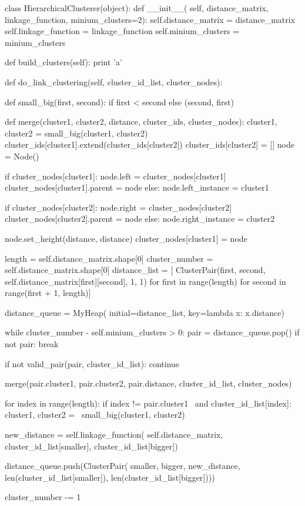 \documentclass[10pt]{article}
\begin{document}
\begin{python}
	
	class HierarchicalClusterer(object):
	def __init__(
	self,
	distance_matrix,
	linkage_function,
	minium_clusters=2):
	self.distance_matrix = distance_matrix
	self.linkage_function = linkage_function
	self.minium_clusters = minium_clusters
	
	def build_clusters(self):
	print 'a'
	
	def do_link_clustering(self, cluster_id_list, cluster_nodes):
	
	def small_big(first, second):
	if first < second else (second, first)
	
	def merge(cluster1,
	cluster2,
	distance,
	cluster_ids,
	cluster_nodes):
	cluster1, cluster2 = small_big(cluster1, cluster2)
	cluster_ids[cluster1].extend(cluster_ids[cluster2])
	cluster_ids[cluster2] = []
	node = Node()
	
	if cluster_nodes[cluster1]:
	node.left = cluster_nodes[cluster1]
	cluster_nodes[cluster1].parent = node
	else:
	node.left_instance = cluster1
	
	if cluster_nodes[cluster2]:
	node.right = cluster_nodes[cluster2]
	cluster_nodes[cluster2].parent = node
	else:
	node.right_instance = cluster2
	
	node.set_height(distance, distance)
	cluster_nodes[cluster1] = node
	
	length = self.distance_matrix.shape[0]
	cluster_number = self.distance_matrix.shape[0]
	distance_list = [
	ClusterPair(first,
	second,
	self.distance_matrix[first][second], 1, 1)
	for first in range(length) for second in range(first + 1, length)]
	
	distance_queue = MyHeap(
	initial=distance_list,
	key=lambda x: x.distance)
	
	while cluster_number - self.minium_clusters > 0:
	pair = distance_queue.pop()
	if not pair:
	break
	
	if not valid_pair(pair, cluster_id_list):
	continue
	
	merge(pair.cluster1, pair.cluster2,
	pair.distance, cluster_id_list, cluster_nodes)
	
	for index in range(length):
	if index != pair.cluster1 \
	and cluster_id_list[index]:
	cluster1, cluster2 = \
	small_big(cluster1, cluster2)
	
	new_distance = self.linkage_function(
	self.distance_matrix,
	cluster_id_list[smaller],
	cluster_id_list[bigger])
	
	distance_queue.push(ClusterPair(
	smaller,
	bigger,
	new_distance,
	len(cluster_id_list[smaller]),
	len(cluster_id_list[bigger])))
	
	cluster_number -= 1
	
\end{python}
\end{document}
